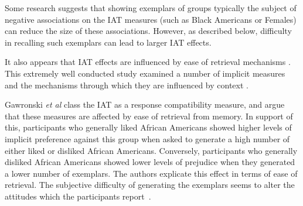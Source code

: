 
Some research \cite{Dasgupta2001} suggests that showing exemplars of groups typically the subject of negative associations on the IAT measures (such as Black Americans or Females) can reduce the size of these associations. However, as described below, difficulty in recalling such exemplars can lead to larger IAT effects. 

It also appears that IAT effects are influenced by ease of retrieval mechanisms \cite{Kahneman2002} . This extremely well conducted study examined a number of implicit measures and the mechanisms through which they are influenced by context \cite{Gawronski2005}. 

Gawronski \textit{et al} class the IAT as a response compatibility measure, and argue that these measures are affected by ease of retrieval from memory. In support of this, participants who generally liked African Americans showed higher levels of implicit preference against this group when asked to generate a high number of either liked or disliked African Americans. Conversely, participants who generally disliked African Americans showed lower levels of prejudice when they generated a lower number of exemplars. The authors explicate this effect in terms of ease of retrieval. The subjective difficulty of generating the exemplars seems to alter the attitudes which the participants report~\cite{Kahneman2002}.




